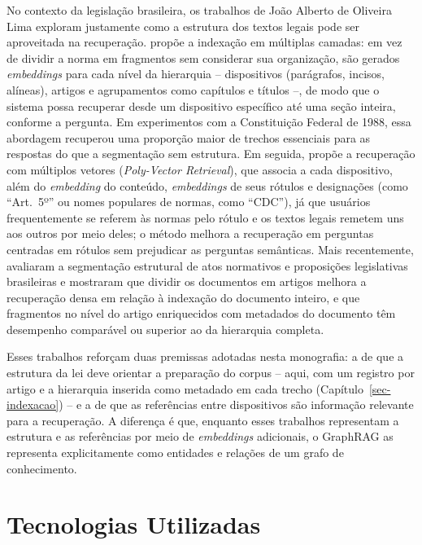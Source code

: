 No contexto da legislação brasileira, os trabalhos de João Alberto de Oliveira Lima exploram justamente como a estrutura dos textos legais pode ser aproveitada na recuperação.  propõe a indexação em múltiplas camadas: em vez de dividir a norma em fragmentos sem considerar sua organização, são gerados \textit{embeddings} para cada nível da hierarquia -- dispositivos (parágrafos, incisos, alíneas), artigos e agrupamentos como capítulos e títulos --, de modo que o sistema possa recuperar desde um dispositivo específico até uma seção inteira, conforme a pergunta. Em experimentos com a Constituição Federal de 1988, essa abordagem recuperou uma proporção maior de trechos essenciais para as respostas do que a segmentação sem estrutura. Em seguida,  propõe a recuperação com múltiplos vetores (\textit{Poly-Vector Retrieval}), que associa a cada dispositivo, além do \textit{embedding} do conteúdo, \textit{embeddings} de seus rótulos e designações (como ``Art.~5º'' ou nomes populares de normas, como ``CDC''), já que usuários frequentemente se referem às normas pelo rótulo e os textos legais remetem uns aos outros por meio deles; o método melhora a recuperação em perguntas centradas em rótulos sem prejudicar as perguntas semânticas. Mais recentemente,  avaliaram a segmentação estrutural de atos normativos e proposições legislativas brasileiras e mostraram que dividir os documentos em artigos melhora a recuperação densa em relação à indexação do documento inteiro, e que fragmentos no nível do artigo enriquecidos com metadados do documento têm desempenho comparável ou superior ao da hierarquia completa.

Esses trabalhos reforçam duas premissas adotadas nesta monografia: a de que a estrutura da lei deve orientar a preparação do corpus -- aqui, com um registro por artigo e a hierarquia inserida como metadado em cada trecho (Capítulo~\ref{sec-indexacao}) -- e a de que as referências entre dispositivos são informação relevante para a recuperação. A diferença é que, enquanto esses trabalhos representam a estrutura e as referências por meio de \textit{embeddings} adicionais, o GraphRAG as representa explicitamente como entidades e relações de um grafo de conhecimento.

\Needspace*{0.6\textheight}
\section{Tecnologias Utilizadas}
\label{sec-referencial-tecnologias}

